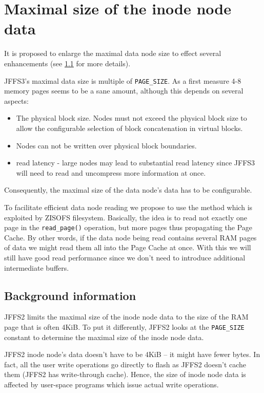 \documentclass[12pt,a4paper,oneside,titlepage]{article}
\begin{document}
\section{Maximal size of the inode node data}
It is proposed to enlarge the maximal data node size to effect several
enhancements (see \ref{ref_BackgroundInformation} for more details).

JFFS3's maximal data size is multiple of \texttt{PAGE\_SIZE}. As a
first measure 4-8 memory pages seems to be a sane amount, although
this depends on several aspects:

\begin{itemize}
\item The physical block size. Nodes must not exceed the physical block size 
to allow the configurable selection of block concatenation in virtual blocks.

\item Nodes can not be written over physical block boundaries.

\item read latency - large nodes may lead to substantial read latency
since JFFS3 will need to read and uncompress more information at once.
\end{itemize}

Consequently, the maximal size of the data node's data has to be configurable.

To facilitate efficient data node reading we propose to use the method which is
exploited by ZISOFS filesystem. Basically, the idea is to read not exactly one
page in the \texttt{read\_page()} operation, but more pages thus propagating the
Page Cache. By other words, if the data node being read contains several RAM
pages of data we might read them all into the Page Cache at once. With this we
will still have good read performance since we don't need to introduce
additional intermediate buffers.

%
%
\subsection{Background information} \label{ref_BackgroundInformation}
JFFS2 limits the maximal size of the inode node data to the size of the
RAM page that is often 4KiB. To put it differently, JFFS2 looks at the 
\texttt{PAGE\_SIZE} constant to determine the maximal size of the inode
node data.

JFFS2 inode node's data doesn't have to be 4KiB -- it might
have fewer bytes. In fact, all the user write operations go directly to
flash as JFFS2 doesn't cache them (JFFS2 has write-through cache).
Hence, the size of inode node data is affected by user-space
programs which issue actual write operations.
\end{document}
